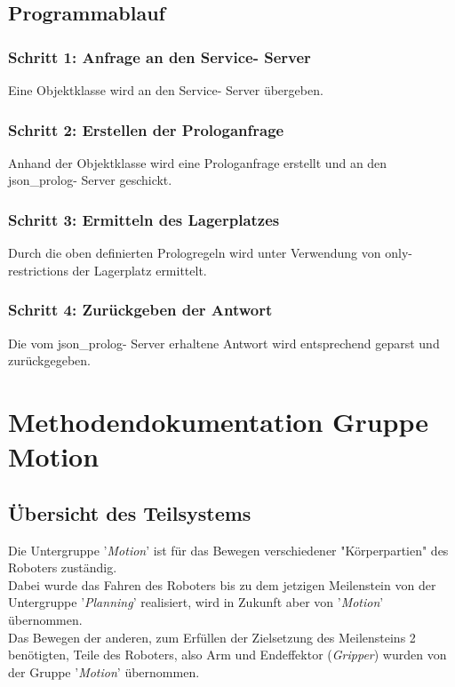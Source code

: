 \documentclass{suturo}
\begin{document}
\subsection{Programmablauf}
\subsubsection{Schritt 1: Anfrage an den Service- Server}
Eine Objektklasse wird an den Service- Server übergeben.
\subsubsection{Schritt 2: Erstellen der Prologanfrage}
Anhand der Objektklasse wird eine Prologanfrage erstellt und an den json\_prolog- Server geschickt.
\subsubsection{Schritt 3: Ermitteln des Lagerplatzes} 
Durch die oben definierten Prologregeln wird unter Verwendung von only- restrictions der Lagerplatz ermittelt.
\subsubsection{Schritt 4: Zurückgeben der Antwort}
Die vom json\_prolog- Server erhaltene Antwort wird entsprechend geparst und zurückgegeben.

\newpage

\section*{Methodendokumentation Gruppe Motion}

\subsection{Übersicht des Teilsystems}
Die Untergruppe '\textit{Motion}' ist für das Bewegen verschiedener "Körperpartien" des Roboters zuständig.\\
Dabei wurde das Fahren des Roboters bis zu dem jetzigen Meilenstein von der Untergruppe '\textit{Planning}' realisiert, wird
in Zukunft aber von '\textit{Motion}' übernommen.\\
Das Bewegen der anderen, zum Erfüllen der Zielsetzung des Meilensteins 2 benötigten, Teile des Roboters, also Arm und Endeffektor (\textit{Gripper}) wurden 
von der Gruppe '\textit{Motion}' übernommen.\\
\end{document}
